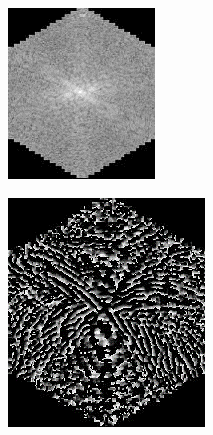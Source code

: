 \documentclass[10pt,letterpaper]{article}
\begin{document}
\begin{figure}[htb]
            \centering
	\captionsetup[subfigure]{justification=centering}
	\begin{subfigure}[b]{0.2\linewidth}
	\centering
	\includegraphics[width=1\columnwidth]{fig10_a}
	\caption{}
	\end{subfigure}
	\begin{subfigure}[b]{0.2\linewidth}
	\includegraphics[width=1\columnwidth]{fig10_b}

\end{subfigure}
\end{figure}
\end{document}
